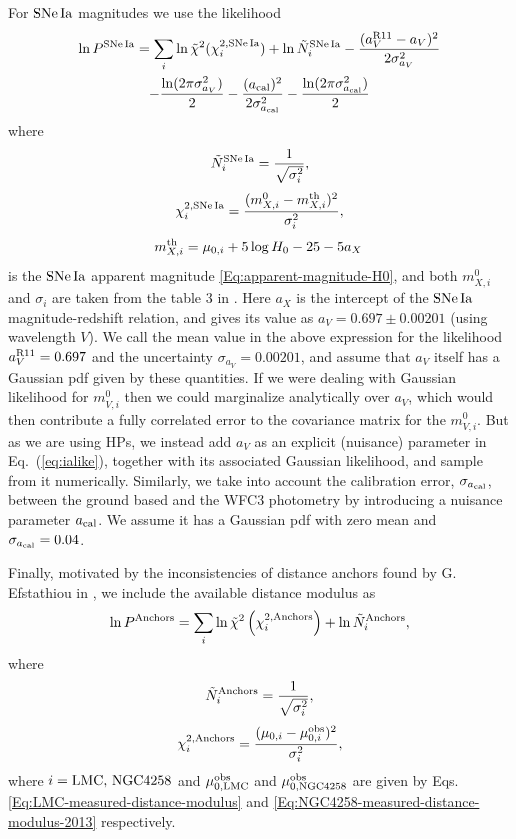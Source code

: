 For $\mathrm{SNe\,Ia}$ magnitudes we use the likelihood
\begin{multline}
\ln P^{\mathrm{SNe\,Ia}}  =  \sum_{i} \ln \tilde{\chi}^{2}(\chi^{2,\mathrm{SNe\,Ia}}_{i}) + \ln \tilde{N}^{\mathrm{SNe\,Ia}}_{i} - \frac{(a^{\rm R11}_V - a_V)^2}{2 \sigma_{a_V}^2} \\
- \frac{\ln (2\pi\sigma_{a_V}^2)}{2} - \frac{(a_{\rm cal})^2}{2 \sigma_{a_{\rm cal}}^2} - \frac{\ln (2\pi\sigma_{a_{\rm cal}}^2)}{2}  
\label{eq:ialike}
\end{multline}
where 
\begin{equation}
\tilde{N}^{\mathrm{SNe\,Ia}}_{i} = \frac{1}{\sqrt{\sigma_{i}^2}},
\end{equation}
\begin{equation}
\chi^{2,\mathrm{SNe\,Ia}}_{i} = \frac{(m^0_{X,i} - m^{\mathrm{th}}_{X,i})^2}{\sigma_{i}^2},
\end{equation}
\begin{equation}
m^{\mathrm{th}}_{X,i} = \mu_{0,i} + 5 \log H_0 - 25 - 5 a_X \, 
\end{equation}
is the $\mathrm{SNe\,Ia}$ apparent magnitude \eqref{Eq:apparent-magnitude-H0}, and both $m^0_{X,i}$ and $\sigma_i$ are taken from the table 3 in \cite{Riess:2011yx}. Here $a_X$ is the intercept of the $\mathrm{SNe\,Ia}$ magnitude-redshift relation, and \cite{Riess:2011yx} gives its value as $a_V = 0.697\pm0.00201$ (using wavelength $V$). We call the mean value 
in the above expression for the likelihood $a^{\rm R11}_V = 0.697$ and the uncertainty $\sigma_{a_V} = 0.00201$, and assume that $a_V$ itself has a Gaussian pdf given by these quantities. If we were dealing with Gaussian likelihood for $m^0_{V,i}$ then we could marginalize analytically over $a_V$, which would then contribute a fully correlated error to the covariance matrix for the $m^0_{V,i}$. But as we are using HPs, we instead add $a_V$ as an explicit (nuisance) parameter in Eq.\ (\ref{eq:ialike}), together with its associated Gaussian likelihood, and sample from it numerically. Similarly, we take into account the calibration error, $\sigma_{a_{\rm cal}}$, between the ground based and the WFC3 photometry by introducing a nuisance parameter $a_{\rm cal}$. We assume it has a Gaussian pdf with zero mean and $\sigma_{a_{\rm cal}}=0.04$.

Finally, motivated by the inconsistencies of distance anchors found by G. Efstathiou in  \cite{Efstathiou:2013via}, we include the available distance modulus as
\begin{equation}
\ln P^{\mathrm{Anchors}} = \sum_{i} \ln \tilde{\chi}^{2}\left( \chi^{2,\mathrm{Anchors}}_{i} \right) + \ln \tilde{N}^{\mathrm{Anchors}}_{i}, 
\end{equation}
where
\begin{equation}
\tilde{N}^{\mathrm{Anchors}}_{i} = \frac{1}{\sqrt{\sigma_{i}^2}},
\end{equation}
\begin{equation}
\chi^{2,\mathrm{Anchors}}_i = \frac{(\mu_{0,i} - \mu^{\mathrm{obs}}_{0,i})^2}{\sigma^2_i},
\end{equation}
where $i=\mathrm{LMC},\,\mathrm{NGC4258}$ and $\mu^{\mathrm{obs}}_{0,\mathrm{LMC}}$ and $\mu^{\mathrm{obs}}_{\rm 0,\mathrm{NGC4258}}$ are given by Eqs. \eqref{Eq:LMC-measured-distance-modulus} and \eqref{Eq:NGC4258-measured-distance-modulus-2013} respectively.

